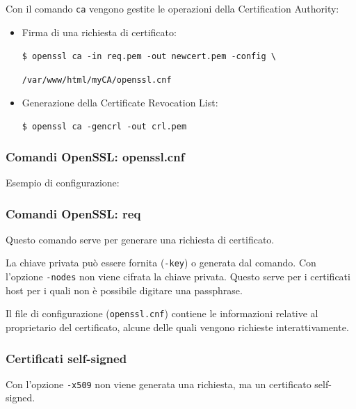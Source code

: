             

            Con il comando \verb|ca| vengono gestite le operazioni della Certification Authority:
            \begin{itemize}
                \item Firma di una richiesta di certificato:
                
                \verb|$ openssl ca -in req.pem -out newcert.pem -config \|
                
                \verb|/var/www/html/myCA/openssl.cnf|
                \item Generazione della Certificate Revocation List:
                
                \verb|$ openssl ca -gencrl -out crl.pem|
            \end{itemize}

        \subsubsection{Comandi OpenSSL: openssl.cnf}
            Esempio di configurazione:

            

        \subsubsection{Comandi OpenSSL: req}
            Questo comando serve per generare una richiesta di certificato.
        
            La chiave privata può essere fornita (\verb|-key|) o generata dal comando. Con l'opzione \verb|-nodes| non viene cifrata la chiave privata. Questo serve per i certificati host per i quali non è possibile digitare una passphrase.
        
            Il file di configurazione (\verb|openssl.cnf|) contiene le informazioni relative al proprietario del certificato, alcune delle quali vengono richieste interattivamente.
        
            
        
        \subsubsection{Certificati self-signed}
            Con l'opzione \verb|-x509| non viene generata una richiesta, ma un certificato self-signed.
        
